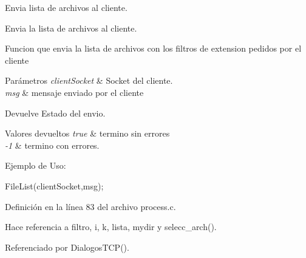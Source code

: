 Envia lista de archivos al cliente. 

Envia la lista de archivos al cliente.

Funcion que envia la lista de archivos con los filtros de extension pedidos por el cliente


\begin{DoxyParams}{Parámetros}
{\em clientSocket} & Socket del cliente. \\
\hline
{\em msg} & mensaje enviado por el cliente\\
\hline
\end{DoxyParams}
\begin{DoxyReturn}{Devuelve}
Estado del envio. 
\end{DoxyReturn}

\begin{DoxyRetVals}{Valores devueltos}
{\em true} & termino sin errores \\
\hline
{\em -\/1} & termino con errores.\\
\hline
\end{DoxyRetVals}
Ejemplo de Uso: 
\begin{DoxyCode}
                
                FileList(clientSocket,msg);  
\end{DoxyCode}
 

Definición en la línea 83 del archivo process.c.



Hace referencia a filtro, i, k, lista, mydir y selecc\_\-arch().



Referenciado por DialogosTCP().


